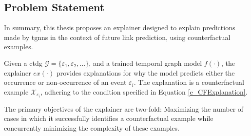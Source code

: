 




\subsection{Problem Statement}
\label{s_ProblemFormulation_ProblemStatement}

In summary, this thesis proposes an explainer designed to explain predictions made by \glspl{tgnn} in the context of future link prediction, using counterfactual examples.

Given a \gls{ctdg} $\mathcal{G} = \{\varepsilon_{1}, \varepsilon_{2}, ...\}$, and a trained temporal graph model $f(\cdot)$, the explainer $ex(\cdot)$ provides explanations for why the model predicts either the occurrence or non-occurrence of an event $\varepsilon_{i}$. The explanation is a counterfactual example $\mathcal{X}_{\varepsilon_{i}}$, adhering to the condition specified in Equation \ref{e_CFExplanation}. 

The primary objectives of the explainer are two-fold: Maximizing the number of cases in which it successfully identifies a counterfactual example while concurrently minimizing the complexity of these examples.
